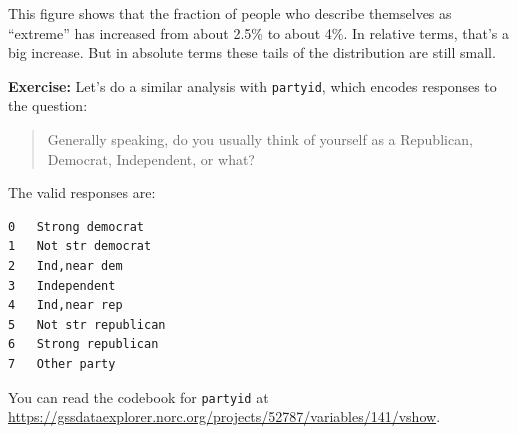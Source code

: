This figure shows that the fraction of people who describe themselves as
``extreme'' has increased from about 2.5\% to about 4\%. In relative
terms, that's a big increase. But in absolute terms these tails of the
distribution are still small.

\textbf{Exercise:} Let's do a similar analysis with
\passthrough{\lstinline!partyid!}, which encodes responses to the
question:

\begin{quote}
Generally speaking, do you usually think of yourself as a Republican,
Democrat, Independent, or what?
\end{quote}

The valid responses are:

\begin{lstlisting}[]
0   Strong democrat
1   Not str democrat
2   Ind,near dem
3   Independent
4   Ind,near rep
5   Not str republican
6   Strong republican
7   Other party
\end{lstlisting}

You can read the codebook for \passthrough{\lstinline!partyid!} at
\url{https://gssdataexplorer.norc.org/projects/52787/variables/141/vshow}.

